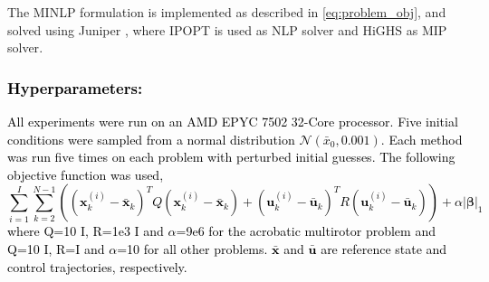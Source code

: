 \documentclass[runningheads]{llncs}
\newcommand{\changes}[1]{\textcolor{black}{#1}}
\begin{document}
The MINLP formulation is implemented as described in  \ref{eq:problem_obj}, and solved using Juniper \cite{juniper}, where IPOPT is used as NLP solver and HiGHS as MIP solver\cite{Wachter2006, huangfu2018parallelizing}.\vspace{-10pt}
\changes{\subsubsection{Hyperparameters:} All experiments were run on an AMD EPYC 7502 32-Core processor. Five initial conditions were sampled from a normal distribution $\mathcal{N}(\bar{x}_0, 0.001)$. Each method was run five times on each problem with perturbed initial guesses. The following objective function was used, 
\begin{equation}\label{eq:obj_func}
    \sum_{i=1}^I\sum_{k=2}^{N-1} \left( (\textbf{x}_k^{(i)} - \bar{\textbf{x}}_k)^T Q (\textbf{x}_k^{(i)} - \bar{\textbf{x}}_k) + (\textbf{u}_k^{(i)} - \bar{\textbf{u}}_k)^T R (\textbf{u}_k^{(i)} - \bar{\textbf{u}}_k) \right) + \alpha\left|\boldsymbol{\beta}\right|_1
\end{equation}
where Q=10 I, R=1e3 I and $\alpha$=9e6 for the acrobatic multirotor problem and Q=10 I, R=I and $\alpha$=10 for all other problems. $\bar{\textbf{x}}$ and $\bar{\textbf{u}}$ are reference state and control trajectories, respectively.}\vspace{-10pt}
\end{document}

